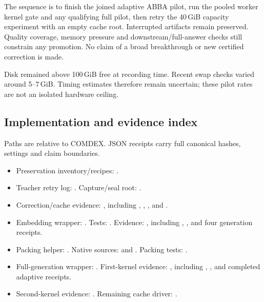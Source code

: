The sequence is to finish the joined adaptive ABBA pilot, run the pooled
worker kernel gate and any qualifying full pilot, then retry the 40\,GiB
capacity experiment with an empty cache root. Interrupted artifacts remain
preserved. Quality coverage, memory pressure and downstream/full-answer
checks still constrain any promotion. No claim of a broad breakthrough
or new certified correction is made.

Disk remained above 100\,GiB free at recording time. Recent swap checks
varied around 5--7\,GiB. Timing estimates therefore remain uncertain;
these pilot rates are not an isolated hardware ceiling.

\subsection{Implementation and evidence index}
Paths are relative to COMDEX. JSON receipts carry full canonical hashes,
settings and claim boundaries.
\begin{itemize}
\item Preservation inventory/recipes:
.
\item Teacher retry log:
.
Capture/seal root:
.
\item Correction/cache evidence:
, including
, ,
,  and
.
\item Embedding wrapper:
.
Tests:
.
Evidence:
, including
, ,
 and four generation receipts.
\item Packing helper:
.
Native sources:
and
.
Packing tests:
.
\item Full-generation wrapper:
.
First-kernel evidence:
, including
, ,
 and completed adaptive receipts.
\item Second-kernel evidence:
.
Remaining cache driver:
.
\end{itemize}
